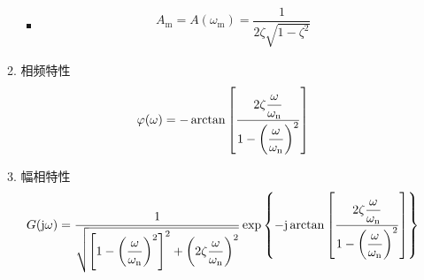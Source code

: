 \begin{enumerate}[1.]
\begin{enumerate}[(1) ]
\begin{itemize}
			\item {}
			\begin{align}
				A_\text{m} = A(\omega_\text{m}) = \dfrac{1}{2 \zeta \sqrt{1-\zeta^2}}
				\label{谐振峰值}
			\end{align}
			
			
		\end{itemize}
		\item 相频特性
		\begin{align}
			\varphi(\omega) = -\arctan \left[\dfrac{2 \zeta \dfrac{\omega}{\omega_{\rm{n}}}}{1 - \left(\dfrac{\omega}{\omega_{\rm{n}}}\right)^2}\right]
		\end{align}
		\vspace*{-1em}
		
		\item 幅相特性
		\vspace*{-0.5em}
		\begin{align}
			G(\text{j} \omega) = \dfrac{1}{\sqrt{\left[1 - \left(\dfrac{\omega}{\omega_{\rm{n}}}\right)^2\right]^2 + \left(2 \zeta \dfrac{\omega}{\omega_{\rm{n}}}\right)^2}} \exp\left\lbrace-\text{j} \arctan \left[\dfrac{2 \zeta \dfrac{\omega}{\omega_{\rm{n}}}}{1 - \left(\dfrac{\omega}{\omega_{\rm{n}}}\right)^2}\right]\right\rbrace
		\end{align}
		\vspace*{-3em}
		

\end{enumerate}
\end{enumerate}

